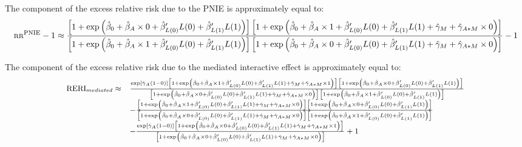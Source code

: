 \documentclass[
]{book}
\begin{document}
The component of the excess relative risk due to the PNIE is approximately equal to:
\[\scriptsize
\text{RR}^\text{PNIE} - 1 \approx \frac{\left[ 1 + \exp \left( \hat{\beta}_0 + \hat{\beta}_A \times 0 + \hat{\beta}_{L(0)}^\prime L(0) + \hat{\beta}_{L(1)}^\prime L(1) \right) \right] \left[ 1 + \exp \left( \hat{\beta}_0 + \hat{\beta}_A \times 1 + \hat{\beta}_{L(0)}^\prime L(0) + \hat{\beta}_{L(1)}^\prime L(1) + \hat{\gamma}_M + \hat{\gamma}_{A \ast M} \times 0 \right) \right]}{\left[ 1 + \exp \left( \hat{\beta}_0 + \hat{\beta}_A \times 1 + \hat{\beta}_{L(0)}^\prime L(0) + \hat{\beta}_{L(1)}^\prime L(1) \right) \right] \left[ 1 + \exp \left( \hat{\beta}_0 + \hat{\beta}_A \times 0 + \hat{\beta}_{L(0)}^\prime L(0) + \hat{\beta}_{L(1)}^\prime L(1) + \hat{\gamma}_M + \hat{\gamma}_{A \ast M} \times 0 \right) \right] } - 1 \]

The component of the excess relative risk due to the mediated interactive effect is approximately equal to:
\[\small
\begin{array}{rl}
\text{RERI}_{mediated} \approx  & \frac{\exp \left[ \hat{\gamma}_A (1 - 0)\right] \left[1 + \exp \left(\hat{\beta}_0 + \hat{\beta}_A \times 1 + \hat{\beta}_{L(0)}^\prime L(0) + \hat{\beta}_{L(1)}^\prime L(1) + \hat{\gamma}_M + \hat{\gamma}_{A \ast M} \times 1\right) \right] \left[1 + \exp \left(\hat{\beta}_0 + \hat{\beta}_A \times 0 + \hat{\beta}_{L(0)}^\prime L(0) + \hat{\beta}_{L(1)}^\prime L(1)\right) \right]}{\left[ 1 + \exp \left(\hat{\beta}_0 + \hat{\beta}_A \times 0 + \hat{\beta}_{L(0)}^\prime L(0) + \hat{\beta}_{L(1)}^\prime L(1) + \hat{\gamma}_M + \hat{\gamma}_{A \ast M} \times 0\right)\right] \left[ 1 + \exp \left(\hat{\beta}_0 + \hat{\beta}_A \times 1 + \hat{\beta}_{L(0)}^\prime L(0) + \hat{\beta}_{L(1)}^\prime L(1) \right) \right]} \\
                                & - \frac{\left[1 + \exp \left(\hat{\beta}_0 + \hat{\beta}_A \times 1 + \hat{\beta}_{L(0)}^\prime L(0) + \hat{\beta}_{L(1)}^\prime L(1) + \hat{\gamma}_M + \hat{\gamma}_{A \ast M} \times 0\right) \right] \left[1 + \exp \left(\hat{\beta}_0 + \hat{\beta}_A \times 0 + \hat{\beta}_{L(0)}^\prime L(0) + \hat{\beta}_{L(1)}^\prime L(1) \right) \right]}{\left[ 1 + \exp \left(\hat{\beta}_0 + \hat{\beta}_A \times 0 + \hat{\beta}_{L(0)}^\prime L(0) + \hat{\beta}_{L(1)}^\prime L(1) + \hat{\gamma}_M + \hat{\gamma}_{A \ast M} \times 0 \right)\right] \left[ 1 + \exp \left(\hat{\beta}_0 + \hat{\beta}_A \times 1 + \hat{\beta}_{L(0)}^\prime L(0) + \hat{\beta}_{L(1)}^\prime L(1)  \right) \right]} \\
                                & - \frac{\exp \left[ \hat{\gamma}_A (1 - 0)\right] \left[1 + \exp \left(\hat{\beta}_0 + \hat{\beta}_A \times 0 + \hat{\beta}_{L(0)}^\prime L(0) + \hat{\beta}_{L(1)}^\prime L(1) + \hat{\gamma}_M + \hat{\gamma}_{A \ast M} \times 1 \right) \right]}{\left[ 1 + \exp \left(\hat{\beta}_0 + \hat{\beta}_A \times 0 + \hat{\beta}_{L(0)}^\prime L(0) + \hat{\beta}_{L(1)}^\prime L(1) + \hat{\gamma}_M + \hat{\gamma}_{A \ast M} \times 0 \right)\right]} + 1
\end{array}\]
\end{document}
